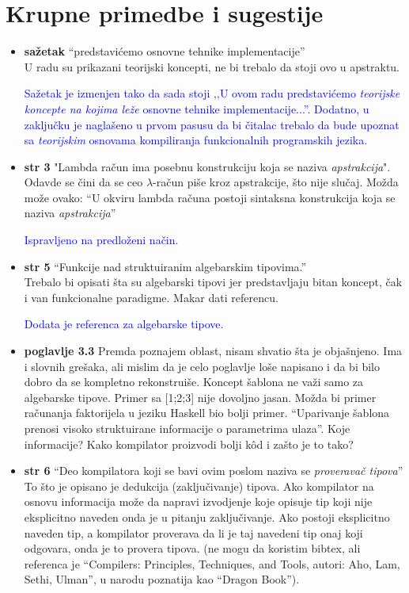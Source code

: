 \documentclass[a4paper]{report}
\newcommand{\odgovor}[1]{\textcolor{blue}{#1}}
\begin{document}
\section{Krupne primedbe i sugestije}
\begin{itemize}
\item \textbf{sažetak} ``predstavićemo osnovne tehnike implementacije'' \\ U radu su prikazani teorijski koncepti, ne bi trebalo da stoji ovo u apstraktu.

\odgovor{Sažetak je izmenjen tako da sada stoji ‚‚U ovom radu predstavićemo \textit{teorijske koncepte na kojima leže} osnovne tehnike implementacije...''. Dodatno, u zaključku je naglašeno u prvom pasusu da bi čitalac trebalo da bude upoznat sa \textit{teorijskim} osnovama kompiliranja funkcionalnih programskih jezika.}

\item \textbf{str 3} "Lambda račun ima posebnu konstrukciju koja se naziva \textit{apstrakcija}".\\Odavde se čini da se ceo $\lambda$-račun piše kroz apstrakcije, što nije slučaj. Možda može ovako: ``U okviru lambda računa postoji sintaksna konstrukcija koja se naziva \textit{apstrakcija}''

\odgovor{Ispravljeno na predloženi način.}

\item \textbf{str 5} ``Funkcije nad struktuiranim algebarskim tipovima.'' \\ Trebalo bi opisati šta su algebarski tipovi jer predstavljaju bitan koncept, čak i van funkcionalne paradigme. Makar dati referencu.

\odgovor{Dodata je referenca za algebarske tipove.}

\item \textbf{poglavlje 3.3} Premda poznajem oblast, nisam shvatio šta je objašnjeno. Ima i slovnih grešaka, ali mislim da je celo poglavlje loše napisano i da bi bilo dobro da se kompletno rekonstruiše. Koncept šablona ne važi samo za algebarske tipove. Primer sa [1;2;3] nije dovoljno jasan. Možda bi primer računanja faktorijela u jeziku Haskell bio bolji primer. ``Uparivanje šablona prenosi visoko struktuirane informacije o parametrima ulaza''. Koje informacije? Kako kompilator proizvodi bolji kôd i zašto je to tako?


\item \textbf{str 6} ``Deo kompilatora koji se bavi ovim poslom naziva se \textit{proveravač tipova}'' \\ To što je opisano je dedukcija (zaključivanje) tipova. Ako kompilator na osnovu informacija može da napravi izvodjenje koje opisuje tip koji nije eksplicitno naveden onda je u pitanju zaključivanje. Ako postoji eksplicitno naveden tip, a kompilator proverava da li je taj navedeni tip onaj koji odgovara, onda je to provera tipova. (ne mogu da koristim bibtex, ali referenca je ``Compilers: Principles, Techniques, and Tools, autori: Aho, Lam, Sethi, Ulman'', u narodu poznatija kao ``Dragon Book'').


\end{itemize}
\end{document}
